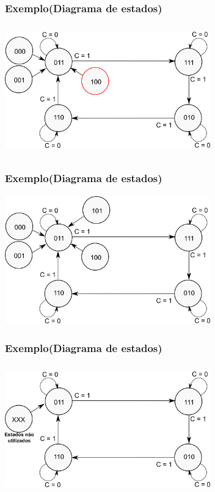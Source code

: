 \documentclass{beamer}
\begin{document}
\begin{frame}
  \frametitle{Exemplo(Diagrama de estados)}
  \begin{center}
    \includegraphics[height = 2.2in, width = 3.5in]{exemplo_projeto_8.png}
  \end{center}
\end{frame}

\begin{frame}
  \frametitle{Exemplo(Diagrama de estados)}
  \begin{center}
    \includegraphics[height = 2.2in, width = 3.5in]{exemplo_projeto_9.png}
  \end{center}
\end{frame}

\begin{frame}
  \frametitle{Exemplo(Diagrama de estados)}
  \begin{center}
    \includegraphics[height = 2.2in, width = 3.5in]{exemplo_projeto_10.png}
  \end{center}
\end{frame}
\end{document}
